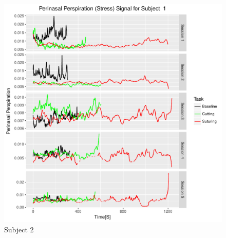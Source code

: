 \documentclass[12pt,epsf]{report}
\begin{document}
\begin{figure}[!htb]
\begin{minipage}[c]{0.5\linewidth}
	\includegraphics[width=\linewidth]{s2pp.pdf}
	\caption{Subject 2}
	\end{minipage}
\end{figure}
\FloatBarrier
\end{document}
